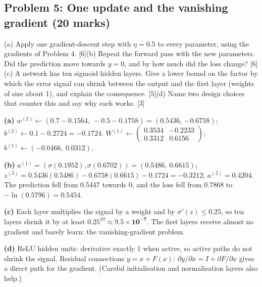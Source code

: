 \documentclass[11pt]{article}
\begin{document}
\subsection{Problem 5: One update and the vanishing gradient \normalfont\small\color{GreyN}(20 marks)}

\begin{prob}(a) Apply one gradient-descent step with $\eta=0.5$ to every parameter, using the gradients of Problem 4. [6]\newline (b) Repeat the forward pass with the new parameters. Did the prediction move towards $y=0$, and by how much did the loss change? [6]\newline (c) A network has ten sigmoid hidden layers. Give a lower bound on the factor by which the error signal can shrink between the output and the first layer (weights of size about 1), and explain the consequence. [5]\newline (d) Name two design choices that counter this and say why each works. [3]\end{prob}

\begin{soln}\textbf{(a)} $w^{(2)}\leftarrow(0.7-0.1564,\ -0.5-0.1758)=(\mathbf{0.5436},\ \mathbf{-0.6758})$; $b^{(2)}\leftarrow0.1-0.2724=\mathbf{-0.1724}$. $W^{(1)}\leftarrow\begin{pmatrix}0.3534&-0.2233\\0.3312&0.6156\end{pmatrix}$; $b^{(1)}\leftarrow(-0.0466,\ 0.0312)$.

\textbf{(b)} $a^{(1)}=(\sigma(0.1952),\sigma(0.6702))=(0.5486,\ 0.6615)$; $z^{(2)}=0.5436(0.5486)-0.6758(0.6615)-0.1724=-0.3212$; $a^{(2)}=\mathbf{0.4204}$. The prediction fell from 0.5447 towards 0, and the loss fell from 0.7868 to $-\ln(0.5796)=\mathbf{0.5454}$.

\textbf{(c)} Each layer multiplies the signal by a weight and by $\sigma'(z)\le0.25$, so ten layers shrink it by at least $0.25^{10}\approx\mathbf{9.5\times10^{-7}}$. The first layers receive almost no gradient and barely learn: the vanishing-gradient problem.

\textbf{(d)} ReLU hidden units: derivative exactly 1 when active, so active paths do not shrink the signal. Residual connections $y=x+F(x)$: $\partial y/\partial x=I+\partial F/\partial x$ gives a direct path for the gradient. (Careful initialisation and normalisation layers also help.)\end{soln}
\end{document}
